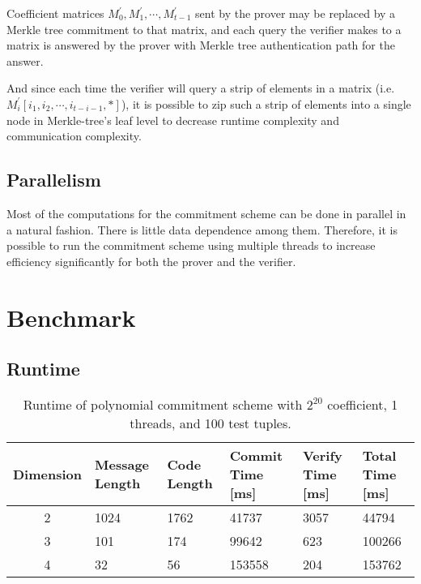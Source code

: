 Coefficient matrices $M_0^\prime, M_1^\prime, \cdots, M_{t-1}^\prime$ sent by the prover may be replaced by a Merkle tree commitment to that matrix, and each query the verifier makes to a matrix is answered by the prover with Merkle tree authentication path for the answer.

And since each time the verifier will query a strip of elements in a matrix (i.e. $M_i^\prime[i_1, i_2, \cdots, i_{t-i-1}, *]$), it is possible to zip such a strip of elements into a single node in Merkle-tree's leaf level to decrease runtime complexity and communication complexity.

\subsection{Parallelism}

Most of the computations for the commitment scheme can be done in parallel in a natural fashion. There is little data dependence among them. Therefore, it is possible to run the commitment scheme using multiple threads to increase efficiency significantly for both the prover and the verifier.


\section{Benchmark}

\subsection{Runtime}


\begin{table}[h!]
\centering
\begin{tabular}{| c | m{4em}  | m{3em}  | m{3.5em} | m{2.5em} | m{3em} |} 
 \hline
 Dimension & Message Length & Code Length & Commit Time [ms] & Verify Time [ms] & Total Time [ms] \\ [0.5ex] 
 \hline\hline
 2 & 1024   & 1762 & 41737  & 3057  & 44794   \\
 \hline
 3 & 101    & 174 & 99642  & 623  & 100266  \\
 \hline
 4 & 32     & 56 & 153558  & 204  & 153762   \\
 \hline
\end{tabular}
\caption{Runtime of polynomial commitment scheme with $2^{20}$ coefficient, 1 threads, and 100 test tuples.}
\label{table:benchmark-pc-1}
\end{table}

